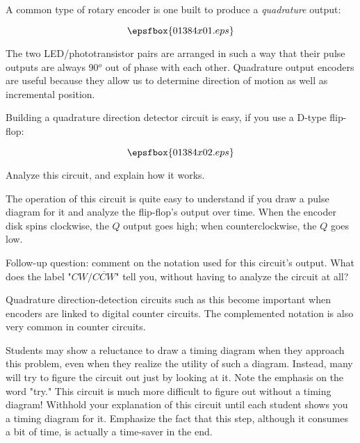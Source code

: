 

A common type of rotary encoder is one built to produce a {\it quadrature} output:

$$\epsfbox{01384x01.eps}$$

The two LED/phototransistor pairs are arranged in such a way that their pulse outputs are always 90$^{o}$ out of phase with each other.  Quadrature output encoders are useful because they allow us to determine direction of motion as well as incremental position.

Building a quadrature direction detector circuit is easy, if you use a D-type flip-flop:

$$\epsfbox{01384x02.eps}$$

Analyze this circuit, and explain how it works.







The operation of this circuit is quite easy to understand if you draw a pulse diagram for it and analyze the flip-flop's output over time.  When the encoder disk spins clockwise, the $Q$ output goes high; when counterclockwise, the $Q$ goes low.

\vskip 10pt

Follow-up question: comment on the notation used for this circuit's output.  What does the label "$CW / \overline{CCW}$" tell you, without having to analyze the circuit at all?







Quadrature direction-detection circuits such as this become important when encoders are linked to digital counter circuits.  The complemented notation is also very common in counter circuits.  

Students may show a reluctance to draw a timing diagram when they approach this problem, even when they realize the utility of such a diagram.  Instead, many will try to figure the circuit out just by looking at it.  Note the emphasis on the word "try."  This circuit is much more difficult to figure out without a timing diagram!  Withhold your explanation of this circuit until each student shows you a timing diagram for it.  Emphasize the fact that this step, although it consumes a bit of time, is actually a time-saver in the end.




